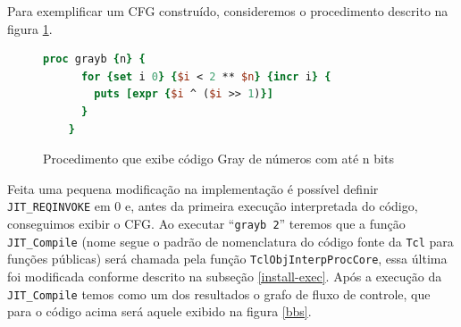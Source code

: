 Para exemplificar um CFG construído, consideremos o procedimento
descrito na figura \ref{fig:gray}.
\begin{figure}[h]
  \centering
  \begin{lstlisting}[language=Tcl]
    proc grayb {n} {
      for {set i 0} {$i < 2 ** $n} {incr i} {
        puts [expr {$i ^ ($i >> 1)}]
      }
    }
  \end{lstlisting}
  \caption{Procedimento que exibe código Gray de números com até n
    bits \label{fig:gray}}
\end{figure}
Feita uma pequena modificação na implementação é possível definir
\verb!JIT_REQINVOKE! em 0 e, antes da primeira execução interpretada do
código, conseguimos exibir o CFG. Ao executar ``\verb!grayb 2!''
teremos que a função \verb!JIT_Compile! (nome segue o padrão de
nomenclatura do código fonte da \texttt{Tcl} para funções públicas)
será chamada pela função
\verb!TclObjInterpProcCore!, essa última foi modificada conforme
descrito na subseção \ref{install-exec}. Após a execução da
\verb!JIT_Compile! temos como um dos resultados o grafo de fluxo de
controle, que para o código acima será aquele exibido na figura \ref{bbs}.

